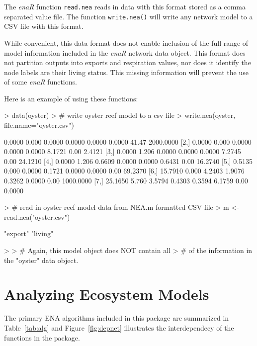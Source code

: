 \documentclass[article]{jss}
\begin{document}
The \textit{enaR} function \texttt{read.nea} reads in data with this
format stored as a comma separated value file.  The function
\texttt{write.nea()} will write any network model to a CSV file with
this format.

While convenient, this data format does not enable inclusion of the
full range of model information included in the \textit{enaR} network
data object.  This format does not partition outputs into exports and
respiration values, nor does it identify the node labels are their
living status. This missing information will prevent the use of some
\textit{enaR} functions.

Here is an example of using these functions:
\begin{Schunk}
\begin{Sinput}
> data(oyster)
> # write oyster reef model to a csv file
> write.nea(oyster, file.name="oyster.csv")
\end{Sinput}
\begin{Soutput}
        [,1]  [,2]   [,3]   [,4]   [,5]   [,6]  [,7]      [,8]
[1,]  0.0000 0.000 0.0000 0.0000 0.0000 0.0000 41.47 2000.0000
[2,]  0.0000 0.000 0.0000 0.0000 0.0000 8.1721  0.00    2.4121
[3,]  0.0000 1.206 0.0000 0.0000 0.0000 7.2745  0.00   24.1210
[4,]  0.0000 1.206 0.6609 0.0000 0.0000 0.6431  0.00   16.2740
[5,]  0.5135 0.000 0.0000 0.1721 0.0000 0.0000  0.00   69.2370
[6,] 15.7910 0.000 4.2403 1.9076 0.3262 0.0000  0.00 1000.0000
[7,] 25.1650 5.760 3.5794 0.4303 0.3594 6.1759  0.00    0.0000
\end{Soutput}
\begin{Sinput}
> # read in oyster reef model data from NEA.m formatted CSV file
> m <- read.nea("oyster.csv")
\end{Sinput}
\begin{Soutput}
[1] "export" "living"
\end{Soutput}
\begin{Sinput}
> 
> # Again, this model object does NOT contain all
> # of the information in the "oyster" data object.
\end{Sinput}
\end{Schunk}




\section{Analyzing Ecosystem Models}

The primary ENA algorithms included in this package are summarized in
Table~\ref{tab:alg} and Figure~\ref{fig:depnet} illustrates the
interdependecy of the functions in the package.
\end{document}
